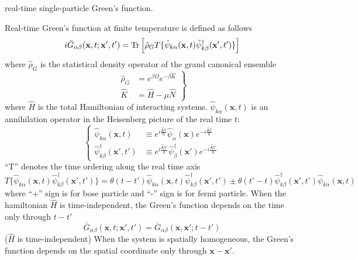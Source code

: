 \begin{center}
real-time single-particle Green's function.
\end{center}
 Real-time Green's function at finite temperature is defined as follows
\begin{equation}\label{eq4.7.1}
i \bar{G}_{\alpha\beta}(\mathbf{x},t;\mathbf{x}',t')=\text{Tr} \left[ \hat{\rho}_G T \{ \hat{\psi}_{k\alpha} (\mathbf{x},t) \hat{\psi}_{k\beta}^\dag (\mathbf{x}',t') \} \right]
\end{equation}
 where $\hat{\rho}_G$ is the statistical density operator of the grand canonical ensemble
\begin{equation}
\left. 
\begin{aligned}
\hat{\rho}_G&=e^{\beta\Omega}e^{-\beta\hat{K}}\\
\hat{K}&=\hat{H}-\mu\hat{N}
\end{aligned}
\right\}
\end{equation}
 where $\hat{H}$ is the total Hamiltonian of interacting systems.
 $\hat{\psi}_{k\alpha} (\mathbf{x},t)$ is an annihilation operator in the Heisenberg picture of the real time $t$:
\begin{equation}
\left\{
\begin{aligned}
\hat{\psi}_{k\alpha} (\mathbf{x},t) &\equiv e^{i\frac{\hat{K}t}{\hbar}} \hat{\psi}_{\alpha} (\mathbf{x}) e^{-i\frac{\hat{K}t}{\hbar}} \\
\hat{\psi}^\dag_{k\beta} (\mathbf{x}',t') &\equiv e^{i\frac{\hat{K}t'}{\hbar}} \hat{\psi}_{\beta}^\dag (\mathbf{x}') e^{-i\frac{\hat{K}t'}{\hbar}}
\end{aligned}
\right.
\end{equation}
 ``T'' denotes the time ordering along the real time axis
\[
T\{ \hat{\psi}_{k\alpha} (\mathbf{x},t) \hat{\psi}^\dag_{k\beta} (\mathbf{x}',t')  \}
=\theta(t-t')  \hat{\psi}_{k\alpha} (\mathbf{x},t) \hat{\psi}^\dag_{k\beta} (\mathbf{x}',t')
\pm\theta(t'-t)  \hat{\psi}^\dag_{k\beta} (\mathbf{x}',t') \hat{\psi}_{k\alpha} (\mathbf{x},t)
\]
where ``+'' sign is for bose particle and ``-'' sign is for fermi particle.
 When the hamiltonian $\hat{H}$ is time-independent, the Green's function depends on the time only through $t-t'$
\begin{equation}
\bar{G}_{\alpha\beta}(\mathbf{x},t;\mathbf{x}',t')=\bar{G}_{\alpha\beta}(\mathbf{x},\mathbf{x}';t-t')
\end{equation}
($\hat{H}$ is time-independent)
 When the system is spatially homogeneous, the Green's function depends on the spatial coordinate only through $\mathbf{x}-\mathbf{x}'$.
